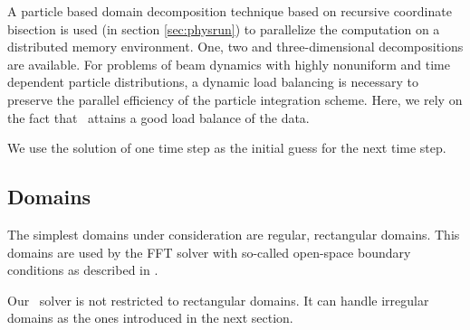 A particle based domain decomposition technique based on recursive coordinate
bisection is used (in section \ref{sec:physrun}) to parallelize the computation
on a distributed memory environment.  One, two and three-dimensional
decompositions are available.  For problems of beam dynamics with highly
nonuniform and time dependent particle distributions, a dynamic load balancing
is necessary to preserve the parallel efficiency of the particle integration
scheme.  Here, we rely on the fact that \ippl\ attains a good load balance of
the data.



We use the solution of one time step as the initial guess for the next
time step.


\subsection{Domains}

The simplest domains under consideration are regular, rectangular
domains.  This domains are used by the FFT solver with so-called
open-space boundary conditions as described in \cite{hoea:88}. 


Our \oursolver\ solver is not restricted to rectangular domains.  It can handle
irregular domains as the ones introduced in the next section.

